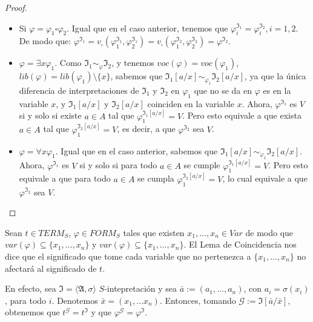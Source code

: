 \begin{proof}
\begin{enumerate}
\begin{itemize}
        \item Si $\varphi=\varphi_1\square\varphi_2$. Igual que en el caso anterior, tenemos que $\varphi_i^{\mathfrak{I}_1}=\varphi_i^{\mathfrak{I}_2},i=1,2$. De modo que:
        $\varphi^{\mathfrak{I}_1}=v_\square(\varphi_1^{\mathfrak{I}_1},\varphi_2^{\mathfrak{I}_1})=v_\square(\varphi_1^{\mathfrak{I}_2},\varphi_2^{\mathfrak{I}_2})=\varphi^{\mathfrak{I}_2}$.
        
        \item $\varphi=\exists x \varphi_1$. Como $\mathfrak{I}_{1} \sim_{\varphi} \mathfrak{I}_{2}$, y tenemos $voc(\varphi)=voc(\varphi_1)$, $lib(\varphi)=lib(\varphi_1)\setminus \{x\}$, sabemos que $\mathfrak{I}_1[a/x]\sim_{\varphi_1}\mathfrak{I}_2[a/x]$, ya que la única diferencia de interpretaciones de $\mathfrak{I}_1$ y $\mathfrak{I}_2$ en $\varphi_1$ que no se da en $\varphi$ es en la variable $x$, y $\mathfrak{I}_1[a/x]$ y $\mathfrak{I}_2[a/x]$ coinciden en la variable $x$. Ahora,
        $\varphi^{\mathfrak{I}_1}$ es $V$ si y solo si existe $a\in A$ tal que $\varphi_1^{\mathfrak{I}_1[a/x]} = V$. Pero esto equivale a que exista $a\in A$ tal que $\varphi_1^{\mathfrak{I}_2[a/x]} = V$, es decir, a que $\varphi^{\mathfrak{I}_2}$ sea $V$.
        
        \item $\varphi=\forall x \varphi_1$. Igual que en el caso anterior, sabemos que $\mathfrak{I}_1[a/x]\sim_{\varphi_1}\mathfrak{I}_2[a/x]$. Ahora,
        $\varphi^{\mathfrak{I}_1}$ es $V$ si y solo si para todo $a\in A$ se cumple $\varphi_1^{\mathfrak{I}_1[a/x]} = V$. Pero esto equivale a que para todo $a\in A$ se cumpla $\varphi_1^{\mathfrak{I}_2[a/x]} = V$, lo cual equivale a que $\varphi^{\mathfrak{I}_2}$ sea $V$.
    \end{itemize}
\end{enumerate}
\end{proof}

\begin{example}
Sean $t \in TERM_S$, $\varphi \in FORM_S$ tales que existen $x_1, \dots, x_n \in Var$ de modo que $var(\varphi) \subseteq \{x_1, \dots, x_n\}$ y $var(\varphi) \subseteq \{x_1, \dots, x_n\}$. El Lema de Coincidencia nos dice que el significado que tome cada variable que no pertenezca a $\{x_1, \dots, x_n \}$ no afectará al significado de $t$.

En efecto, sea $\mathfrak{I} = \langle \mathfrak{A}, \sigma\rangle$ $S$-intepretación y sea $\bar{a} := (a_1, \dots, a_n)$, con $a_i = \sigma(x_i)$, para todo $i$. Denotemos $\bar{x} = (x_1, \dots x_n)$. Entonces, tomando $\mathcal{G} := \mathfrak{I}[\bar{a}/\bar{x}]$, obtenemos que $t^{\mathcal{G}} = t^{\mathfrak{I}}$ y que $\varphi^{\mathcal{G}} = \varphi^{\mathfrak{I}}$.
\end{example}

